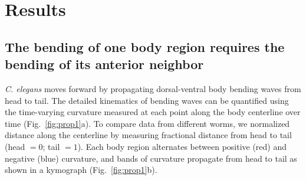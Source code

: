 \section{Results}
\subsection{The bending of one body region requires the bending of its anterior neighbor}

\textit{C. elegans} moves forward by propagating dorsal-ventral body bending waves from head to tail. 
The detailed kinematics of bending waves can be quantified using the time-varying curvature 
measured at each point along the body centerline over time (Fig.~\ref{fig:prop1}a). To compare data from different worms, we normalized distance along the centerline by measuring fractional distance 
from head to tail (head $=0$; tail $=1$). Each body region alternates between positive (red) and 
negative (blue) curvature, and bands of curvature propagate from head to tail as shown in a 
kymograph (Fig.~\ref{fig:prop1}b). 





